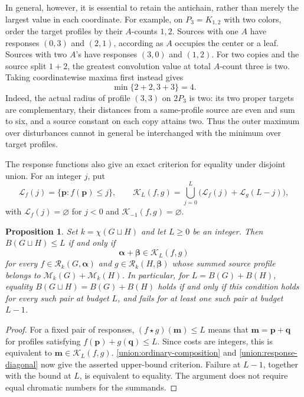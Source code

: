 \documentclass[10pt,a4paper]{amsart}
\numberwithin{equation}{section}
\newtheorem{proposition}[theorem]{Proposition}
\theoremstyle{definition}
\theoremstyle{remark}
\begin{document}
In general, however, it is essential to retain the antichain, rather than merely the largest
value in each coordinate. For example, on $P_3=K_{1,2}$ with two
colors, order the target profiles by their $A$-counts $1,2$. Sources
with one $A$ have responses $(0,3)$ and $(2,1)$, according as $A$
occupies the center or a leaf. Sources with two $A$'s have responses
$(3,0)$ and $(1,2)$. For two copies and the source split $1+2$,
the greatest convolution value at total $A$-count three is two.
Taking coordinatewise maxima first instead gives
\[
 \min\{2+2,3+3\}=4.
\]
Indeed, the actual radius of profile $(3,3)$ on $2P_3$ is two:
its two proper targets are complementary, their distances from a
same-profile source are even and sum to six, and a source constant
on each copy attains two. Thus the outer maximum over disturbances
cannot in general be interchanged with the minimum over target profiles.

The response functions also give an exact criterion for equality
under disjoint union. For an integer $j$, put
\[
 \mathcal L_f(j)=\{\mathbf p:f(\mathbf p)\le j\},
 \qquad
 \mathcal K_L(f,g)=
 \bigcup_{j=0}^{L}
 \bigl(\mathcal L_f(j)+\mathcal L_g(L-j)\bigr),
\]
with $\mathcal L_f(j)=\varnothing$ for $j<0$ and
$\mathcal K_{-1}(f,g)=\varnothing$.

\begin{proposition}\label{union:ordinary-equality}
Set $k=\chi(G\sqcup H)$ and let $L\ge0$ be an integer.
Then $B(G\sqcup H)\le L$ if and only if
\begin{equation}\label{union:budget-cover}
 \boldsymbol\alpha+\boldsymbol\beta\in\mathcal K_L(f,g)
\end{equation}
for every
$f\in\mathcal R_k(G,\boldsymbol\alpha)$ and
$g\in\mathcal R_k(H,\boldsymbol\beta)$ whose summed source profile
belongs to $\mathcal M_k(G)+\mathcal M_k(H)$.
In particular, for $L=B(G)+B(H)$, equality
$B(G\sqcup H)=B(G)+B(H)$ holds if and only if this condition holds
for every such pair at budget $L$, and fails for at least one such
pair at budget $L-1$.
\end{proposition}

\begin{proof}
For a fixed pair of responses,
$(f\star g)(\mathbf m)\le L$ means that
$\mathbf m=\mathbf p+\mathbf q$ for profiles satisfying
$f(\mathbf p)+g(\mathbf q)\le L$. Since costs are integers, this
is equivalent to $\mathbf m\in\mathcal K_L(f,g)$.
\cref{union:ordinary-composition} and
\eqref{union:response-diagonal} now give the asserted upper-bound
criterion. Failure at $L-1$, together with the bound at $L$, is
equivalent to equality. The argument does not require equal chromatic
numbers for the summands.
\end{proof}
\end{document}
